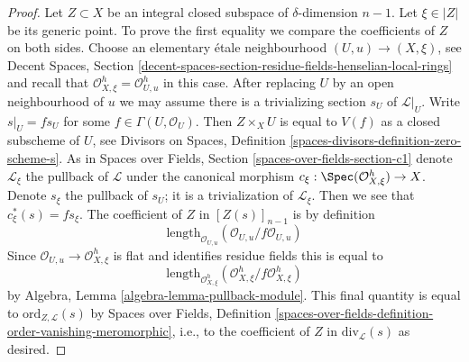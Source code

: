 \begin{proof}
Let $Z \subset X$ be an integral closed subspace of $\delta$-dimension $n - 1$.
Let $\xi \in |Z|$ be its generic point. To prove the first equality
we compare the coefficients of $Z$ on both sides. Choose an elementary
\'etale neighbourhood $(U, u) \to (X, \xi)$, see
Decent Spaces, Section
\ref{decent-spaces-section-residue-fields-henselian-local-rings}
and recall that $\mathcal{O}_{X, \xi}^h = \mathcal{O}_{U, u}^h$
in this case. After replacing $U$ by an open neighbourhood
of $u$ we may assume there is a trivializing section
$s_U$ of $\mathcal{L}|_U$. Write $s|_U = f s_U$ for some
$f \in \Gamma(U, \mathcal{O}_U)$. Then $Z \times_X U$ is
equal to $V(f)$ as a closed subscheme of $U$, see
Divisors on Spaces, Definition \ref{spaces-divisors-definition-zero-scheme-s}.
As in Spaces over Fields, Section \ref{spaces-over-fields-section-c1}
denote $\mathcal{L}_\xi$ the pullback of $\mathcal{L}$
under the canonical morphism
$c_\xi : \Spec(\mathcal{O}_{X, \xi}^h) \to X$.
Denote $s_\xi$ the pullback of $s_U$; it is a trivialization of
$\mathcal{L}_\xi$. Then we see that
$c_\xi^*(s) = fs_\xi$. The coefficient of $Z$ in $[Z(s)]_{n - 1}$
is by definition
$$
\text{length}_{\mathcal{O}_{U, u}}(\mathcal{O}_{U, u}/f\mathcal{O}_{U, u})
$$
Since $\mathcal{O}_{U, u} \to \mathcal{O}_{X, \xi}^h$
is flat and identifies residue fields this is equal to
$$
\text{length}_{\mathcal{O}_{X, \xi}^h}
(\mathcal{O}_{X, \xi}^h/f\mathcal{O}_{X, \xi}^h)
$$
by Algebra, Lemma \ref{algebra-lemma-pullback-module}.
This final quantity is equal to $\text{ord}_{Z, \mathcal{L}}(s)$ by
Spaces over Fields, Definition
\ref{spaces-over-fields-definition-order-vanishing-meromorphic}, i.e.,
to the coefficient of $Z$ in
$\text{div}_\mathcal{L}(s)$
as desired.
\end{proof}

